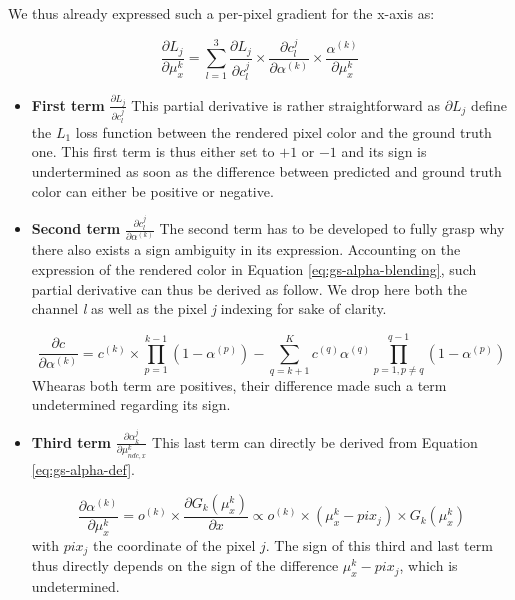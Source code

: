 We thus already expressed such a per-pixel gradient for the x-axis as: 

\begin{equation}
    \label{eq:perpix-grad-appendix}
    \frac{\partial L_{j}}{\partial \mu^{k}_{x}} = \sum \limits_{l=1}^{3} \frac{\partial L_{j}}{\partial c_{l}^{j}}\times \frac{\partial c_{l}^{j}}{\partial \alpha^{(k)}} \times \frac{\alpha^{(k)}}{\partial \mu^{k}_{x}}
    \end{equation}

\begin{itemize}
    
    \item \textbf{First term} $\frac{\partial L_{j}}{\partial c_{l}^{j}}$ 
This partial derivative is rather straightforward as $\partial L_{j}$ define the $L_{1}$ loss function between the rendered pixel color and the ground truth one. This first term is thus either set to $+1$ or $-1$ and its sign is undertermined as soon as the difference between predicted and ground truth color can either be positive or negative. 

    \item \textbf{Second term} $\frac{\partial c_{l}^{j}}{\partial \alpha^{(k)}}$ 
The second term has to be developed to fully grasp why there also exists a sign ambiguity in its expression. Accounting on the expression of the rendered color in Equation \eqref{eq:gs-alpha-blending}, such partial derivative can thus be derived as follow. We drop here both the channel  \textit{l} as well as the pixel \textit{j} indexing for sake of clarity.  

\begin{equation}
    \frac{\partial c}{\partial \alpha^{(k)}} = c^{(k)} \times \prod \limits_{p=1}^{k-1}(1 - \alpha^{(p)}) - \sum \limits_{q=k+1}^{K} c^{(q)}\alpha^{(q)}\prod \limits_{p=1,p\neq q}^{q-1}(1 - \alpha^{(p)})
\end{equation}
Whearas both term are positives, their difference made such a term undetermined regarding its sign. 

    \item \textbf{Third term} $\frac{\partial \alpha_{k}^{j}}{\partial \mu^{k}_{ndc,x}}$ 
This last term can directly be derived from Equation \eqref{eq:gs-alpha-def}. 

\begin{equation}
    \frac{\partial \alpha^{(k)}}{\partial \mu^{k}_{x}} =  o^{(k)} \times \frac{\partial G_{k}(\mu^{k}_{x})}{\partial x} \propto o^{(k)} \times (\mu^{k}_{x} - pix_{j}) \times G_{k}(\mu^{k}_{x})
\end{equation}
with $pix_{j}$ the coordinate of the pixel $j$. The sign of this third and last term thus directly depends on the sign of the difference $\mu^{k}_{x} - pix_{j}$, which is undetermined. 

\end{itemize}






